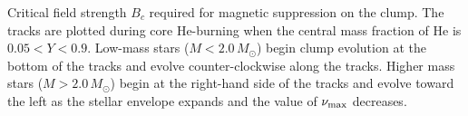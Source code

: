 \label{fig:BcClump}
Critical field strength $B_c$ required for magnetic suppression on the clump. The tracks are plotted during core He-burning when the central mass fraction of He is $0.05 < Y < 0.9$. Low-mass stars ($M<2.0 \, M_\odot$) begin clump evolution at the bottom of the tracks and evolve counter-clockwise along the tracks. Higher mass stars ($M>2.0 \, M_\odot$) begin at the right-hand side of the tracks and evolve toward the left as the stellar envelope expands and the value of $\nu_{\rm max}$ decreases.
  